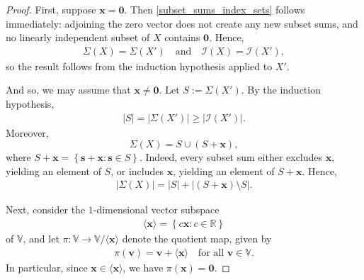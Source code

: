 \documentclass[12pt]{article}
\theoremstyle{definition}
\theoremstyle{remark}
\newcommand{\VV}{\mathbb{V}} %
\newcommand{\set}[1]{\left\{ #1 \right\}}
\newcommand{\abs}[1]{\left| #1 \right|}
\begin{document}
\begin{proof}
    First, suppose $\mathbf{x} = \mathbf{0}$. Then \eqref{subset_sums_index_sets} follows immediately: adjoining the zero vector does not create any new subset sums, and no linearly independent subset of $X$ contains $\mathbf{0}$. Hence, \begin{align*}
        \Sigma(X) = \Sigma(X') \quad \text{and} \quad \mathcal{I}(X) = \mathcal{I}(X'),
    \end{align*} so the result follows from the induction hypothesis applied to $X'$.

    And so, we may assume that $\mathbf{x} \neq \mathbf{0}$. Let $S := \Sigma(X')$. By the induction hypothesis, \begin{align}\label{induct_X}
        \abs{S} = \abs{\Sigma(X')} \geq \abs{\mathcal{I}(X')}. 
\end{align} Moreover, \[\Sigma(X) = S \cup (S+\mathbf{x}),\] where $S+\mathbf{x} = \set{\mathbf{s}+\mathbf{x} : \mathbf{s} \in S}$. Indeed, every subset sum either excludes $\mathbf{x}$, yielding an element of $S$, or includes $\mathbf{x}$, yielding an element of $S+\mathbf{x}$. Hence, \begin{align}\label{split_sigmaX}
    \abs{\Sigma(X)} = \abs{S} + \abs{(S+\mathbf{x}) \setminus S}.
\end{align}

Next, consider the $1$-dimensional vector subspace \begin{align*}
    \langle \mathbf{x} \rangle = \set{c\mathbf{x} : c \in \mathbb{R}}
\end{align*} of $\VV$, and let $\pi : \VV \to \VV / \langle \mathbf{x} \rangle$ denote the quotient map, given by \begin{align*}
    \pi(\mathbf{v}) = \mathbf{v}+ \langle \mathbf{x} \rangle \quad \text{for all } \mathbf{v} \in \VV.
\end{align*} In particular, since $\mathbf{x} \in \langle \mathbf{x} \rangle$, we have $\pi(\mathbf{x}) = \mathbf{0}$. 


\end{proof}
\end{document}
